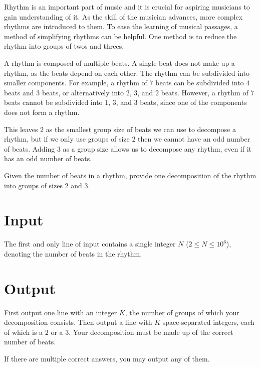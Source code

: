 
Rhythm is an important part of music and it is crucial for aspiring musicians to gain understanding of it.
As the skill of the musician advances, more complex rhythms are introduced to them.
To ease the learning of musical passages, a method of simplifying rhythms can be helpful.
One method is to reduce the rhythm into groups of twos and threes.

A rhythm is composed of multiple beats.
A single beat does not make up a rhythm, as the beats depend on each other.
The rhythm can be subdivided into smaller components.
For example, a rhythm of $7$ beats can be subdivided into $4$ beats and $3$ beats, or alternatively into $2$, $3$, and $2$ beats.
However, a rhythm of $7$ beats cannot be subdivided into $1$, $3$, and  $3$ beats, since one of the components does not form a rhythm.

This leaves $2$ as the smallest group size of beats we can use to decompose a rhythm, but if we only use groups of size $2$ then we cannot have an odd number of beats.
Adding $3$ as a group size allows us to decompose any rhythm, even if it has an odd number of beats.

Given the number of beats in a rhythm, provide one decomposition of the rhythm into groups of sizes $2$ and $3$.

\section*{Input}
The first and only line of input contains a single integer $N$ ($2 \leq N \leq 10^6$), denoting the number of beats in the rhythm.

\section*{Output}
First output one line with an integer $K$, the number of groups of which your decomposition consists.
Then output a line with $K$ space-separated integers, each of which is a $2$ or a $3$.
Your decomposition must be made up of the correct number of beats.

If there are multiple correct answers, you may output any of them.
